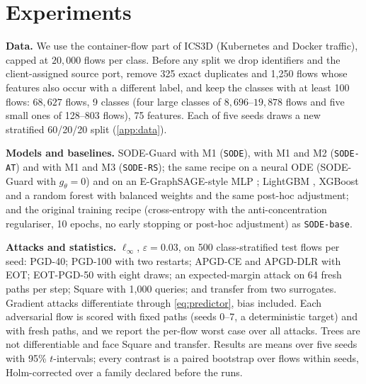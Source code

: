 \documentclass{article}
\theoremstyle{definition}
\begin{document}
\section{Experiments}\label{sec:exp}
\textbf{Data.} We use the container-flow part of ICS3D \citep{anon_ics3d}
(Kubernetes and Docker traffic), capped at $20{,}000$ flows per class. Before
any split we drop identifiers and the client-assigned source port, remove 325
exact duplicates and 1{,}250 flows whose features also occur with a different
label, and keep the classes with at least 100 flows: $68{,}627$ flows, 9 classes
(four large classes of $8{,}696$--$19{,}878$ flows and five small ones of
128--803 flows), 75 features. Each of five seeds draws a new stratified
60/20/20 split (\cref{app:data}).

\textbf{Models and baselines.} SODE-Guard with M1 (\texttt{SODE}), with M1 and
M2 (\texttt{SODE-AT}) and with M1 and M3 (\texttt{SODE-RS}); the same recipe on
a neural ODE (SODE-Guard with $g_\theta=0$) and on an E-GraphSAGE-style MLP
\citep{lo2022egraphsage}; LightGBM \citep{ke2017lightgbm}, XGBoost
\citep{chen2016xgboost} and a random forest \citep{breiman2001rf} with balanced
weights and the same post-hoc adjustment; and the original training recipe
(cross-entropy with the anti-concentration regulariser, 10 epochs, no early
stopping or post-hoc adjustment) as \texttt{SODE-base}.

\textbf{Attacks and statistics.} $\ell_\infty$, $\varepsilon=0.03$, on 500
class-stratified test flows per seed: PGD-40; PGD-100 with two restarts;
APGD-CE and APGD-DLR \citep{croce2020autoattack} with EOT; EOT-PGD-50 with eight
draws; an expected-margin attack on 64 fresh paths per step; Square
\citep{andriushchenko2020square} with 1{,}000 queries; and transfer from two
surrogates. Gradient attacks differentiate through \eqref{eq:predictor}, bias
included. Each adversarial flow is scored with fixed paths (seeds 0--7, a
deterministic target) and with fresh paths, and we report the per-flow worst
case over all attacks. Trees are not differentiable and face Square and
transfer. Results are means over five seeds with 95\% $t$-intervals; every
contrast is a paired bootstrap over flows within seeds, Holm-corrected
\citep{holm1979} over a family declared before the runs.
\end{document}
